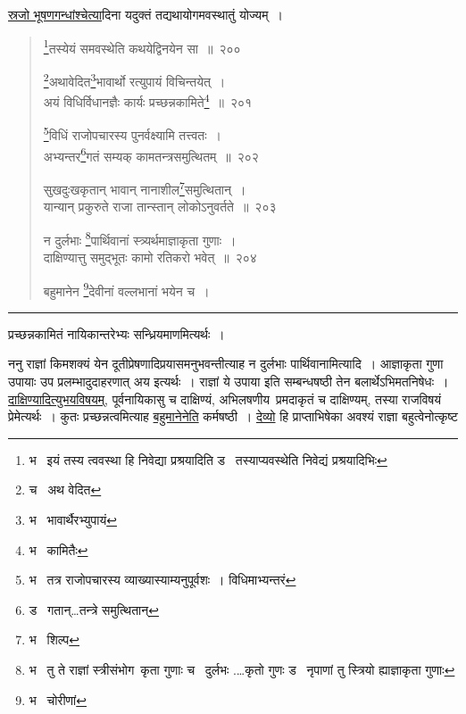 \documentclass[11pt, openany]{book}
\begin{document}
\underline{स्रजो भूषणगन्धांश्चेत्या}दिना यदुक्तं तद्यथायोगमवस्थातुं योज्यम्~।

\newpage

\begin{quote}
{\na \renewcommand{\thefootnote}{1}\footnote{भ \textendash\  इयं तस्य त्ववस्था हि निवेद्या प्रश्रयादिति ड \textendash\  तस्याप्यवस्थेति निवेद्यं प्रश्रयादिभिः}तस्येयं समवस्थेति कथयेद्विनयेन सा~॥~२००

\renewcommand{\thefootnote}{2}\footnote{च \textendash\  अथ वेदित}अथावेदित\renewcommand{\thefootnote}{3}\footnote{भ \textendash\  भावार्थैरभ्युपायं}भावार्थो रत्युपायं विचिन्तयेत्~।\\
अयं विधिर्विधानज्ञैः कार्यः प्रच्छन्नकामिते\renewcommand{\thefootnote}{4}\footnote{भ \textendash\  कामितैः}~॥~२०१

\renewcommand{\thefootnote}{5}\footnote{भ \textendash\  तत्र राजोपचारस्य व्याख्यास्याम्यनुपूर्वशः~। विधिमाभ्यन्तरं}विधिं राजोपचारस्य पुनर्वक्ष्यामि तत्त्वतः~।\\
अभ्यन्तर\renewcommand{\thefootnote}{6}\footnote{ड \textendash\  गतान्\ldots तन्त्रे समुत्थितान्}गतं सम्यक् कामतन्त्रसमुत्थितम्~॥~२०२

सुखदुःखकृतान् भावान् नानाशील\renewcommand{\thefootnote}{7}\footnote{भ \textendash\  शिल्प}समुत्थितान्~।\\
यान्यान् प्रकुरुते राजा तान्स्तान् लोकोऽनुवर्तते~॥~२०३

न दुर्लभाः \renewcommand{\thefootnote}{8}\footnote{भ \textendash\  तु ते राज्ञां स्त्रीसंभोग\textendash\ कृता गुणाः च \textendash\  दुर्लभः .\ldots कृतो गुणः ड \textendash\  नृपाणां तु स्त्रियो ह्याज्ञाकृता गुणाः}पार्थिवानां स्त्र्यर्थमाज्ञाकृता गुणाः~।\\
दाक्षिण्यात्तु समुद्भूतः कामो रतिकरो भवेत्~॥~२०४ 

बहुमानेन \renewcommand{\thefootnote}{9}\footnote{भ \textendash\  चोरीणां}देवीनां वल्लभानां भयेन च~।}
\end{quote}

\hrule

\vspace{2mm}
\noindent
प्रच्छन्नकामितं नायिकान्तरेभ्यः सन्ध्रियमाणमित्यर्थः~।\\

\begin{sloppypar}
ननु राज्ञां किमशक्यं येन दूतीप्रेषणादिप्रयासमनुभवन्तीत्याह न दुर्लभाः पार्थिवानामित्यादि~। आज्ञाकृता गुणा उपायाः उप प्रलम्भादुदाहरणात् अय इत्यर्थः~। राज्ञां ये उपाया इति सम्बन्धषष्ठी तेन बलार्थेऽभिमतनिषेधः~। \underline{दाक्षिण्यादित्युभयविषयम्}, पूर्वनायिकासु च दाक्षिण्यं, अभिलषणीय\textendash\ प्रमदाकृतं च दाक्षिण्यम्, तस्या राजविषयं प्रेमेत्यर्थः~। कुतः प्रच्छन्नत्वमित्याह \underline{बहुमानेनेति} कर्मषष्ठी~। \underline{देव्यो} हि प्राप्ताभिषेका अवश्यं राज्ञा बहुत्वेनोत्कृष्ट\textendash
\end{sloppypar}
\end{document}
